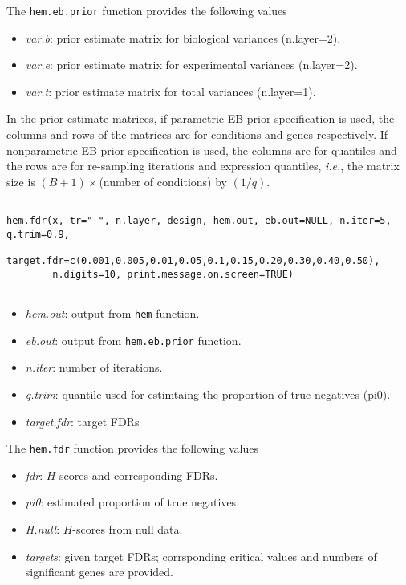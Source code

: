 \documentclass[12pt]{article}
\newcommand{\Rfunction}[1]{{\texttt{#1}}}
\newcommand{\Rfunarg}[1]{{\textit{#1}}}
\begin{document}
\null \vspace{0.1in}
\noindent The \Rfunction{hem.eb.prior} function provides the following values
\begin{itemize}
\item{\Rfunarg{var.b}}: prior estimate matrix for biological variances (n.layer=2).
\item{\Rfunarg{var.e}}: prior estimate matrix for experimental variances (n.layer=2).
\item{\Rfunarg{var.t}}: prior estimate matrix for total variances (n.layer=1).
\end{itemize}
In the prior estimate matrices, if parametric EB prior specification is used, 
the columns and rows of the matrices are for conditions and genes respectively.
If nonparametric EB prior specification is used, the columns are for quantiles 
and the rows are for re-sampling iterations and expression quantiles, 
{\it i.e.}, the matrix size is $(B+1)\times$(number of conditions) by $(1/q)$.


\begin{verbatim}

hem.fdr(x, tr=" ", n.layer, design, hem.out, eb.out=NULL, n.iter=5, q.trim=0.9,
        target.fdr=c(0.001,0.005,0.01,0.05,0.1,0.15,0.20,0.30,0.40,0.50),
        n.digits=10, print.message.on.screen=TRUE)
       
\end{verbatim}



\begin{itemize}
\item{\Rfunarg{hem.out}}: {output from \Rfunction{hem} function}.
\item{\Rfunarg{eb.out}}: {output from \Rfunction{hem.eb.prior} function}.
\item{\Rfunarg{n.iter}}: {number of iterations}.
\item{\Rfunarg{q.trim}}: {quantile used for estimtaing the proportion of true negatives (pi0)}.
\item{\Rfunarg{target.fdr}}: {target FDRs}
\end{itemize}

\null \vspace{0.1in}
\noindent The \Rfunction{hem.fdr} function provides the following values
\begin{itemize}
\item{\Rfunarg{fdr}}: $H$-scores and corresponding FDRs.
\item{\Rfunarg{pi0}}: estimated proportion of true negatives.
\item{\Rfunarg{H.null}}: $H$-scores from null data.
\item{\Rfunarg{targets}}: given target FDRs; corrsponding critical values and numbers
          of significant genes are provided.
\end{itemize}


%
%
%
\end{document}
